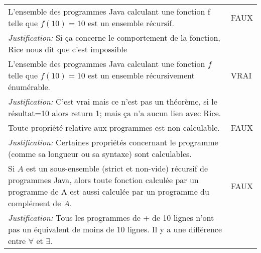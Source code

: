\begin{tabular}{p{13cm}|l}
    L'ensemble des programmes Java calculant une fonction f telle que $f(10)=10$ est un ensemble récursif. & FAUX \\
    \textit{Justification:} Si ça concerne le comportement de la fonction, Rice nous dit que c'est impossible & \\ \hline
    L'ensemble des programmes Java calculant une fonction $f$ telle que $f(10) = 10$ est un ensemble récursivement énumérable. & VRAI \\
    \textit{Justification:} C'est vrai mais ce n'est pas un théorème, si le résultat=10 alors return 1; mais ça n'a aucun lien avec Rice. & \\ \hline
    Toute propriété relative aux programmes est non calculable. & FAUX \\
    \textit{Justification:} Certaines propriétés concernant le programme (comme sa longueur ou sa syntaxe) sont calculables. & \\ \hline
    Si $A$ est un sous-ensemble (strict et non-vide) récursif de programmes Java, alors toute fonction calculée par un programme de A est aussi calculée par un programme du complément de $A$. & FAUX \\
    \textit{Justification:} Tous les programmes de + de 10 lignes n'ont pas un équivalent de moins de 10 lignes. Il y a une différence entre $\forall$ et $\exists$. & \\
\end{tabular}